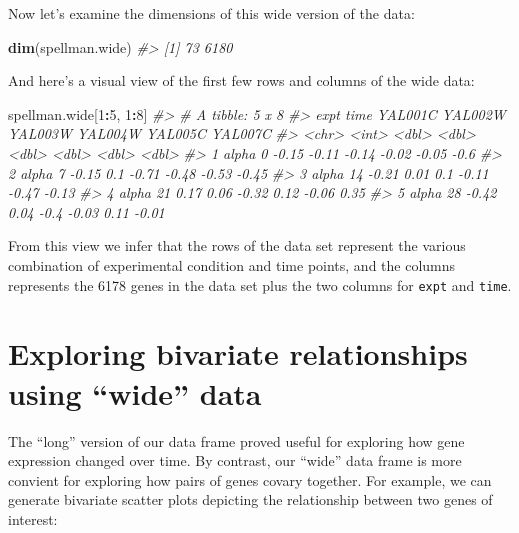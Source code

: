 \documentclass[]{book}
\newenvironment{Shaded}{\begin{snugshade}}{\end{snugshade}}
\newcommand{\CommentTok}[1]{\textcolor[rgb]{0.56,0.35,0.01}{\textit{#1}}}
\newcommand{\DecValTok}[1]{\textcolor[rgb]{0.00,0.00,0.81}{#1}}
\newcommand{\KeywordTok}[1]{\textcolor[rgb]{0.13,0.29,0.53}{\textbf{#1}}}
\newcommand{\NormalTok}[1]{#1}
\newcommand{\OperatorTok}[1]{\textcolor[rgb]{0.81,0.36,0.00}{\textbf{#1}}}
\theoremstyle{definition}
\theoremstyle{definition}
\theoremstyle{definition}
\theoremstyle{remark}
\begin{document}
Now let's examine the dimensions of this wide version of the data:

\begin{Shaded}
\begin{Highlighting}[]
\KeywordTok{dim}\NormalTok{(spellman.wide)}
\CommentTok{#> [1]   73 6180}
\end{Highlighting}
\end{Shaded}

And here's a visual view of the first few rows and columns of the wide
data:

\begin{Shaded}
\begin{Highlighting}[]
\NormalTok{spellman.wide[}\DecValTok{1}\OperatorTok{:}\DecValTok{5}\NormalTok{, }\DecValTok{1}\OperatorTok{:}\DecValTok{8}\NormalTok{]}
\CommentTok{#> # A tibble: 5 x 8}
\CommentTok{#>   expt   time YAL001C YAL002W YAL003W YAL004W YAL005C YAL007C}
\CommentTok{#>   <chr> <int>   <dbl>   <dbl>   <dbl>   <dbl>   <dbl>   <dbl>}
\CommentTok{#> 1 alpha     0   -0.15   -0.11   -0.14   -0.02   -0.05   -0.6 }
\CommentTok{#> 2 alpha     7   -0.15    0.1    -0.71   -0.48   -0.53   -0.45}
\CommentTok{#> 3 alpha    14   -0.21    0.01    0.1    -0.11   -0.47   -0.13}
\CommentTok{#> 4 alpha    21    0.17    0.06   -0.32    0.12   -0.06    0.35}
\CommentTok{#> 5 alpha    28   -0.42    0.04   -0.4    -0.03    0.11   -0.01}
\end{Highlighting}
\end{Shaded}

From this view we infer that the rows of the data set represent the
various combination of experimental condition and time points, and the
columns represents the 6178 genes in the data set plus the two columns
for \texttt{expt} and \texttt{time}.

\hypertarget{exploring-bivariate-relationships-using-wide-data}{%
\section{Exploring bivariate relationships using ``wide''
data}\label{exploring-bivariate-relationships-using-wide-data}}

The ``long'' version of our data frame proved useful for exploring how
gene expression changed over time. By contrast, our ``wide'' data frame
is more convient for exploring how pairs of genes covary together. For
example, we can generate bivariate scatter plots depicting the
relationship between two genes of interest:
\end{document}

